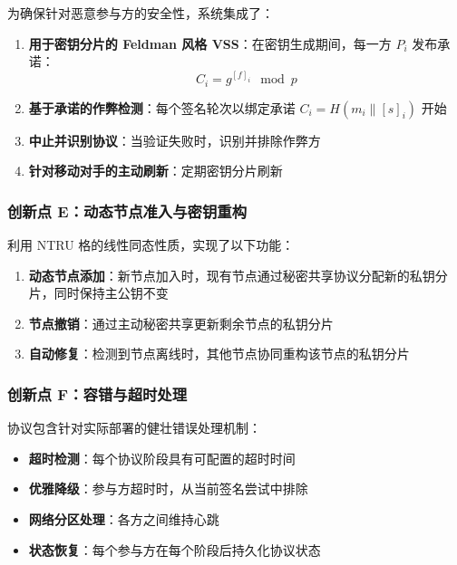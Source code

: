 \documentclass[12pt,a4paper]{article}
\begin{document}
为确保针对恶意参与方的安全性，系统集成了：

\begin{enumerate}
    \item \textbf{用于密钥分片的 Feldman 风格 VSS}：在密钥生成期间，每一方 $P_i$ 发布承诺：
    $$C_i = g^{[f]_i} \mod p$$
    
    \item \textbf{基于承诺的作弊检测}：每个签名轮次以绑定承诺 $C_i = H(m_i \| [s]_i)$ 开始
    
    \item \textbf{中止并识别协议}：当验证失败时，识别并排除作弊方
    
    \item \textbf{针对移动对手的主动刷新}：定期密钥分片刷新
\end{enumerate}

\subsubsection{创新点 E：动态节点准入与密钥重构}

利用 NTRU 格的线性同态性质，实现了以下功能：

\begin{enumerate}
    \item \textbf{动态节点添加}：新节点加入时，现有节点通过秘密共享协议分配新的私钥分片，同时保持主公钥不变
    \item \textbf{节点撤销}：通过主动秘密共享更新剩余节点的私钥分片
    \item \textbf{自动修复}：检测到节点离线时，其他节点协同重构该节点的私钥分片
\end{enumerate}

\subsubsection{创新点 F：容错与超时处理}

协议包含针对实际部署的健壮错误处理机制：

\begin{itemize}
    \item \textbf{超时检测}：每个协议阶段具有可配置的超时时间
    \item \textbf{优雅降级}：参与方超时时，从当前签名尝试中排除
    \item \textbf{网络分区处理}：各方之间维持心跳
    \item \textbf{状态恢复}：每个参与方在每个阶段后持久化协议状态
\end{itemize}
\end{document}
